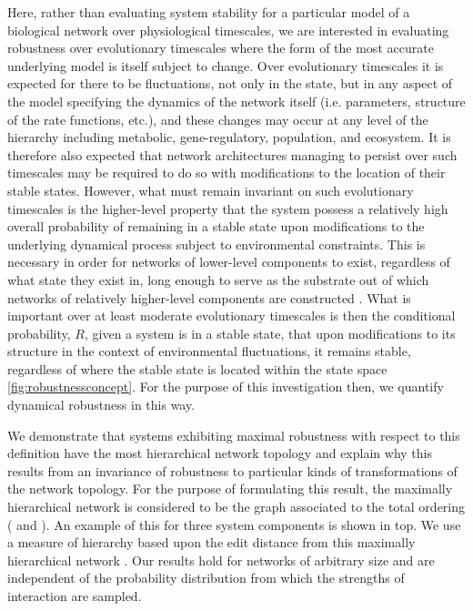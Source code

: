 Here, rather than evaluating system stability for a particular model of a biological network over physiological timescales, we are interested in evaluating robustness over evolutionary timescales where the form of the most accurate underlying model is itself subject to change. Over evolutionary timescales it is expected for there to be fluctuations, not only in the state, but in any aspect of the model specifying the dynamics of the network itself (i.e. parameters, structure of the rate functions, etc.), and these changes may occur at any level of the hierarchy including metabolic, gene-regulatory, population, and ecosystem. It is therefore also expected that network architectures managing to persist over such timescales may be required to do so with modifications to the location of their stable states. However, what must remain invariant on such evolutionary timescales is the higher-level property that the system possess a relatively high overall probability of remaining in a stable state upon modifications to the underlying dynamical process subject to environmental constraints. This is necessary in order for networks of lower-level components to exist, regardless of what state they exist in, long enough to serve as the substrate out of which networks of relatively higher-level components are constructed \cite{Simon2002}. What is important over at least moderate evolutionary timescales is then the conditional probability, $R$, given a system is in a stable state, that upon modifications to its structure in the context of environmental fluctuations, it remains stable, regardless of where the stable state is located within the state space \ref{fig:robustnessconcept}. For the purpose of this investigation then, we quantify dynamical robustness in this way.

We demonstrate that systems exhibiting maximal robustness with respect to this definition have the most hierarchical network topology and explain why this results from an invariance of robustness to particular kinds of transformations of the network topology. For the purpose of formulating this result, the maximally hierarchical network is considered to be the graph associated to the total ordering ( and \cite{Cormen2009}). An example of this for three system components is shown in  top. We use a measure of hierarchy based upon the edit distance from this maximally hierarchical network \cite{Axenovich2011}. Our results hold for networks of arbitrary size and are independent of the probability distribution from which the strengths of interaction are sampled.
